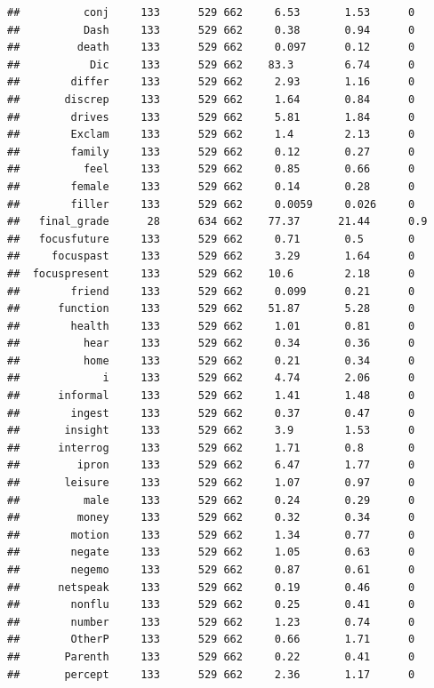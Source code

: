 \documentclass[]{apa6}
\theoremstyle{definition}
\theoremstyle{definition}
\theoremstyle{definition}
\theoremstyle{remark}
\begin{document}
\begin{verbatim}
##          conj     133      529 662     6.53       1.53      0   
##          Dash     133      529 662     0.38       0.94      0   
##         death     133      529 662     0.097      0.12      0   
##           Dic     133      529 662    83.3        6.74      0   
##        differ     133      529 662     2.93       1.16      0   
##       discrep     133      529 662     1.64       0.84      0   
##        drives     133      529 662     5.81       1.84      0   
##        Exclam     133      529 662     1.4        2.13      0   
##        family     133      529 662     0.12       0.27      0   
##          feel     133      529 662     0.85       0.66      0   
##        female     133      529 662     0.14       0.28      0   
##        filler     133      529 662     0.0059     0.026     0   
##   final_grade      28      634 662    77.37      21.44      0.9 
##   focusfuture     133      529 662     0.71       0.5       0   
##     focuspast     133      529 662     3.29       1.64      0   
##  focuspresent     133      529 662    10.6        2.18      0   
##        friend     133      529 662     0.099      0.21      0   
##      function     133      529 662    51.87       5.28      0   
##        health     133      529 662     1.01       0.81      0   
##          hear     133      529 662     0.34       0.36      0   
##          home     133      529 662     0.21       0.34      0   
##             i     133      529 662     4.74       2.06      0   
##      informal     133      529 662     1.41       1.48      0   
##        ingest     133      529 662     0.37       0.47      0   
##       insight     133      529 662     3.9        1.53      0   
##      interrog     133      529 662     1.71       0.8       0   
##         ipron     133      529 662     6.47       1.77      0   
##       leisure     133      529 662     1.07       0.97      0   
##          male     133      529 662     0.24       0.29      0   
##         money     133      529 662     0.32       0.34      0   
##        motion     133      529 662     1.34       0.77      0   
##        negate     133      529 662     1.05       0.63      0   
##        negemo     133      529 662     0.87       0.61      0   
##      netspeak     133      529 662     0.19       0.46      0   
##        nonflu     133      529 662     0.25       0.41      0   
##        number     133      529 662     1.23       0.74      0   
##        OtherP     133      529 662     0.66       1.71      0   
##       Parenth     133      529 662     0.22       0.41      0   
##       percept     133      529 662     2.36       1.17      0   

\end{verbatim}
\end{document}
